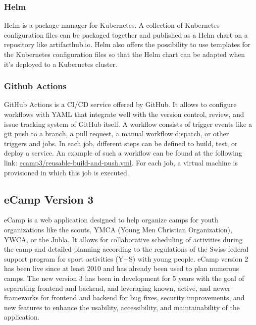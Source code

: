 \documentclass[conference]{IEEEtran}
\begin{document}
\subsubsection{Helm}

Helm is a package manager for Kubernetes\cite{helm-website}.
A collection of Kubernetes configuration files can be packaged together and published as a Helm chart on a repository
like artifacthub.io\cite{artifacthub-io}.
Helm also offers the possibility to use templates for the Kubernetes configuration files so that the Helm chart
can be adapted when it's deployed to a Kubernetes cluster.

\subsubsection{Github Actions}

GitHub Actions is a CI/CD service offered by GitHub\cite{github-actions-website}.
It allows to configure workflows with YAML that integrate well with the version control, review,
and issue tracking system of GitHub itself.
A workflow consists of trigger events like a git push to a branch, a pull request, a manual workflow dispatch, or
other triggers and jobs.
In each job, different steps can be defined to build, test, or deploy a service.
An example of such a workflow can be found at the following link: \href{https://github.com/ecamp/ecamp3/blob/7a1cf92e3eee27b0b942fcd87bd8ce5c221089b7/.github/workflows/reusable-build-and-push.yml}{ecamp3/reusable-build-and-push.yml}.
For each job, a virtual machine is provisioned in which this job is executed\cite{github-actions-about-runner}.

\subsection{eCamp Version 3}

eCamp is a web application designed to help organize camps for youth organizations like the
scouts, YMCA (Young Men Christian Organization)\cite{ymca-website}, YWCA, or the Jubla.
It allows for collaborative scheduling of activities during the camp and detailed planning
according to the regulations of the Swiss federal support program for sport activities (Y+S) with young people\cite{J+S-Website,ecamp3-website}.
eCamp version 2 has been live since at least 2010\cite{ecamp2-first-commit} and has already been used to plan numerous camps.
The new version 3 has been in development for 5 years\cite{ecamp3-website} with the goal of separating frontend and backend,
and leveraging known, active, and newer frameworks for frontend and backend for bug fixes, security improvements,
and new features to enhance the usability, accessibility, and maintainability of the application.
\end{document}
